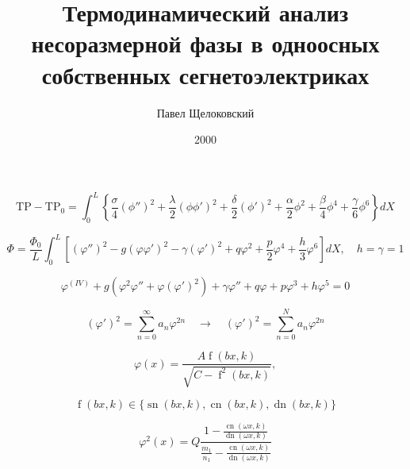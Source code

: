 \documentclass[trans]{beamer}
\author{Павел Щелоковский}
\title{Термодинамический анализ несоразмерной фазы в одноосных собственных сегнетоэлектриках}
\date{2000}
\DeclareMathOperator{\sn}{sn}
\DeclareMathOperator{\cn}{cn}
\DeclareMathOperator{\dn}{dn}
\DeclareMathOperator{\fu}{f}
\begin{document}
\begin{frame}
\begin{equation*}
\mathrm{TP} - \mathrm{TP}_0 = 
 	                      \int^L_0 \left\{\frac{\sigma}{4} \left( \phi'' \right)^2 + 
 	                      \frac{\lambda}{2}\left(\phi\phi'\right)^2 + 
 	                      \frac{\delta}{2}\left(\phi'\right)^2 +
 	                      \frac{\alpha}{2}\phi^2 + \frac{\beta}{4}\phi^4 + 
 	                      \frac{\gamma}{6}\phi^6
 	                      \right\} dX	
\end{equation*}

\begin{equation*}
\Phi = \frac{\Phi_0}{L} \int_0^L \left[
            \left(\varphi''\right)^2 - g\left(\varphi\varphi'\right)^2 -
            \gamma\left(\varphi'\right)^2 +
            q\varphi^2 + \frac{p}{2}\varphi^4 + \frac{h}{3}\varphi^6
            \right] dX, \quad 
h = \gamma = 1
\end{equation*}

\begin{equation*}
\varphi^{(IV)} + 
g\left(\varphi^2\varphi'' + \varphi\left(\varphi'\right)^2\right) +
\gamma\varphi'' + q\varphi + p\varphi^3 + h\varphi^5 = 0
\end{equation*}

\begin{equation*}
\left(\varphi'\right)^2 = \sum_{n=0}^{\infty} a_n\varphi^{2n} \quad \rightarrow \quad
\left(\varphi'\right)^2 = \sum_{n=0}^N a_n\varphi^{2n}
\end{equation*}

\begin{equation*}
\varphi(x) = \frac{A\fu(bx, k)}{\sqrt{C - \fu^2(bx, k)}},
\end{equation*}

\begin{equation*}
\fu(bx, k) \in \{\sn(bx, k), \cn(bx, k), \dn(bx, k)\}
\end{equation*}

\begin{equation*}
\varphi^2(x) = Q
\frac{1-\frac{\cn(\omega x, k)}{\dn(\omega x, k)}}
{\frac{m_1}{n_1} -\frac{\cn(\omega x, k)}{\dn(\omega x, k)}}
\end{equation*}

\end{frame}
\end{document}

